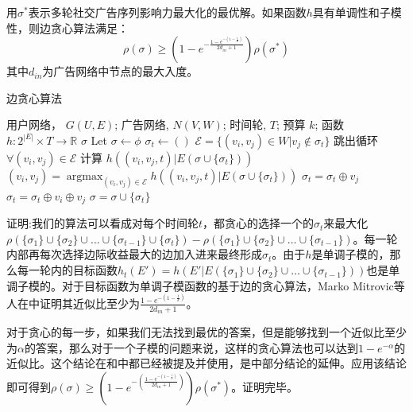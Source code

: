 \begin{theorem}
\label{thm:greedy}
用$\sigma^*$表示多轮社交广告序列影响力最大化的最优解。如果函数$h$具有单调性和子模性，则边贪心算法满足：
\begin{equation}
\rho(\sigma)\ge (1-e^{-\frac{1-e^{-(1-\frac{1}{k})}}{2d_{in}+1}})\rho(\sigma^*)
\end{equation}
\noindent 其中$d_{in}$为广告网络中节点的最大入度。
\end{theorem}
\begin{algorithm}[H]
    \renewcommand{\algorithmcfname}{算法}
    \caption{\label{alg:edge_greedy}边贪心算法} 
    \begin{algorithmic}[1]
    \REQUIRE 用户网络， \(G(U,E)\); 广告网络, \(N(V,W)\);
    时间轮, \(T\); 预算 \(k\);
    函数 \(h:2^{|E|} \times T \to \mathbb{R} \)
    \ENSURE \(\sigma\)
    \STATE Let \(\sigma \gets \phi \)
        \STATE \(\sigma_t \gets ( )\) \label{alg:greedy_line4}
            \STATE \(\mathcal{E} = \{(v_i,v_j) \in W | v_j \notin \sigma_t \}\)
                \STATE 跳出循环
            \ENDIF
            \STATE \(\forall (v_i,v_j) \in \mathcal{E}\) 计算 \(h((v_i,v_j,t)|E(\sigma \cup \{ \sigma_t\}))\) \label{alg:greedy_line3}
            \STATE \((v_i,v_j) = \mathop{\arg\max}_{(v_i,v_j) \in \mathcal{E}}h ((v_i,v_j,t)|E(\sigma \cup \{ \sigma_t\})) \)
                \STATE \(\sigma_t = \sigma_t \oplus v_j\) \label{alg:greedy_line1}
            \ELSE
                \STATE \(\sigma_t = \sigma_t \oplus v_i \oplus v_j\) \label{alg:greedy_line2}
            \ENDIF
        \ENDWHILE \label{alg:greedy_line5}
        \STATE \(\sigma = \sigma \cup \{\sigma_t\}\)
    \ENDFOR
    \end{algorithmic}
\end{algorithm}
证明:我们的算法可以看成对每个时间轮$t$，都贪心的选择一个的$\sigma_t$来最大化$\rho(\{\sigma_1\}\cup \{\sigma_2\}\cup\ldots \cup \{\sigma_{t-1}\}\cup\{\sigma_t\})-\rho(\{\sigma_1\}\cup\{\sigma_2\}\cup\ldots \cup \{\sigma_{t-1}\})$。每一轮内部再每次选择边际收益最大的边加入进来最终形成$\sigma_t$。由于$h$是单调子模的，那么每一轮内的目标函数$h_t(E')=h(E'|E(\{\sigma_1\}\cup\{\sigma_2\}\cup\ldots \cup \{\sigma_{t-1}\}))$也是单调子模的。对于目标函数为单调子模函数的基于边的贪心算法，Marko Mitrovic等人在\parencite{mitrovic2018submodularity}中证明其近似比至少为$\frac{1-e^{-(1-\frac{1}{k})}}{2d_{in}+1}$。

对于贪心的每一步，如果我们无法找到最优的答案，但是能够找到一个近似比至少为$\alpha$的答案，那么对于一个子模的问题来说，这样的贪心算法也可以达到$1-e^{-\alpha}$的近似比。这个结论在\parencite{mrim}和\parencite{goundan2007revisiting}中都已经被提及并使用，是\parencite{nemhauser1978analysis}中部分结论的延伸。应用该结论即可得到$\rho(\sigma)\ge (1-e^{-(\frac{1-e^{-(1-\frac{1}{k})}}{2d_{in}+1})})\rho(\sigma^*)$。证明完毕。


